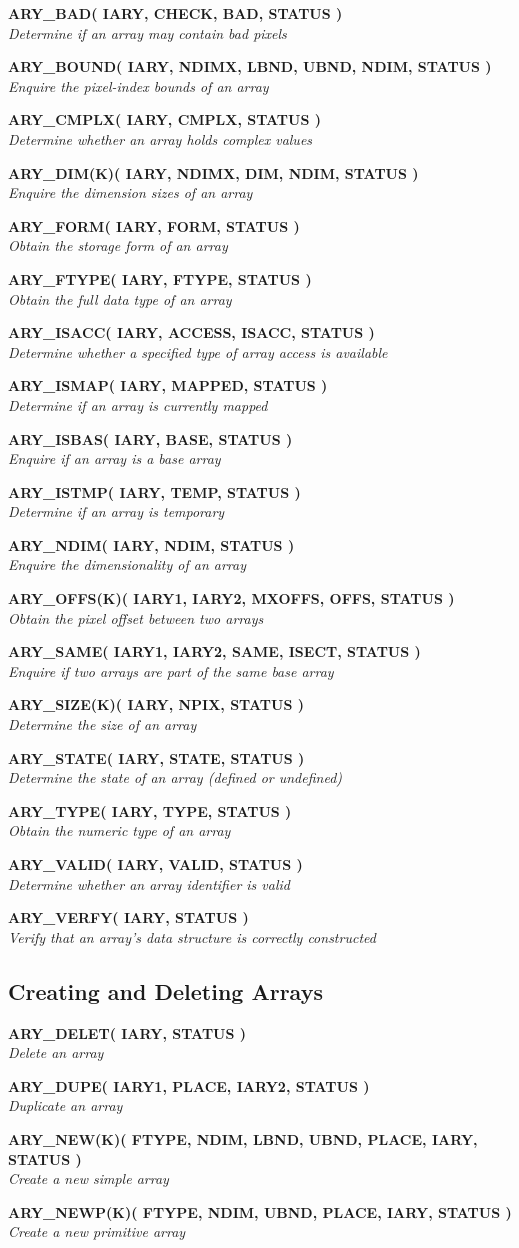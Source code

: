 \documentclass[twoside,11pt,nolof]{starlink}
\providecommand{\noteroutine}[2]{\textbf{#1}\hspace*{\fill}\nopagebreak \\
                             \hspace*{3em}\emph{#2}\hspace*{\fill}\par}
\begin{document}
\noteroutine{ARY\_BAD( IARY, CHECK, BAD, STATUS )}
            {Determine if an array may contain bad pixels}
\noteroutine{ARY\_BOUND( IARY, NDIMX, LBND, UBND, NDIM, STATUS )}
            {Enquire the pixel-index bounds of an array}
\noteroutine{ARY\_CMPLX( IARY, CMPLX, STATUS )}
            {Determine whether an array holds complex values}
\noteroutine{ARY\_DIM(K)( IARY, NDIMX, DIM, NDIM, STATUS )}
            {Enquire the dimension sizes of an array}
\noteroutine{ARY\_FORM( IARY, FORM, STATUS )}
            {Obtain the storage form of an array}
\noteroutine{ARY\_FTYPE( IARY, FTYPE, STATUS )}
            {Obtain the full data type of an array}
\noteroutine{ARY\_ISACC( IARY, ACCESS, ISACC, STATUS )}
            {Determine whether a specified type of array access is available}
\noteroutine{ARY\_ISMAP( IARY, MAPPED, STATUS )}
            {Determine if an array is currently mapped}
\noteroutine{ARY\_ISBAS( IARY, BASE, STATUS )}
            {Enquire if an array is a base array}
\noteroutine{ARY\_ISTMP( IARY, TEMP, STATUS )}
            {Determine if an array is temporary}
\noteroutine{ARY\_NDIM( IARY, NDIM, STATUS )}
            {Enquire the dimensionality of an array}
\noteroutine{ARY\_OFFS(K)( IARY1, IARY2, MXOFFS, OFFS, STATUS )}
            {Obtain the pixel offset between two arrays}
\noteroutine{ARY\_SAME( IARY1, IARY2, SAME, ISECT, STATUS )}
            {Enquire if two arrays are part of the same base array}
\noteroutine{ARY\_SIZE(K)( IARY, NPIX, STATUS )}
            {Determine the size of an array}
\noteroutine{ARY\_STATE( IARY, STATE, STATUS )}
            {Determine the state of an array (defined or undefined)}
\noteroutine{ARY\_TYPE( IARY, TYPE, STATUS )}
            {Obtain the numeric type of an array}
\noteroutine{ARY\_VALID( IARY, VALID, STATUS )}
            {Determine whether an array identifier is valid}
\noteroutine{ARY\_VERFY( IARY, STATUS )}
            {Verify that an array's data structure is correctly constructed}

\subsection{Creating and Deleting Arrays}
\label{creating_and_deleting_arrays}

\noteroutine{ARY\_DELET( IARY, STATUS )}
            {Delete an array}
\noteroutine{ARY\_DUPE( IARY1, PLACE, IARY2, STATUS )}
            {Duplicate an array}
\noteroutine{ARY\_NEW(K)( FTYPE, NDIM, LBND, UBND, PLACE, IARY, STATUS )}
            {Create a new simple array}
\noteroutine{ARY\_NEWP(K)( FTYPE, NDIM, UBND, PLACE, IARY, STATUS )}
            {Create a new primitive array}
\end{document}
